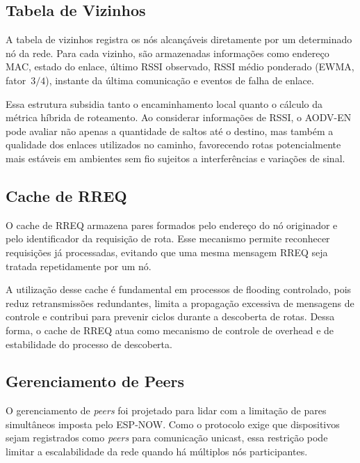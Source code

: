 \subsection{Tabela de Vizinhos}\label{tabela-de-vizinhos}

A tabela de vizinhos registra os nós alcançáveis diretamente por um
determinado nó da rede. Para cada vizinho, são armazenadas informações
como endereço MAC, estado do enlace, último RSSI observado, RSSI médio
ponderado (EWMA, fator~$3/4$), instante da última comunicação e eventos
de falha de enlace.

Essa estrutura subsidia tanto o encaminhamento local quanto o cálculo da
métrica híbrida de roteamento. Ao considerar informações de RSSI, o
AODV-EN pode avaliar não apenas a quantidade de saltos até o destino,
mas também a qualidade dos enlaces utilizados no caminho, favorecendo
rotas potencialmente mais estáveis em ambientes sem fio sujeitos a
interferências e variações de sinal.

\subsection{Cache de RREQ}\label{cache-de-rreq}

O cache de RREQ armazena pares formados pelo endereço do nó originador e
pelo identificador da requisição de rota. Esse mecanismo permite
reconhecer requisições já processadas, evitando que uma mesma mensagem
RREQ seja tratada repetidamente por um nó.

A utilização desse cache é fundamental em processos de flooding
controlado, pois reduz retransmissões redundantes, limita a propagação
excessiva de mensagens de controle e contribui para prevenir ciclos
durante a descoberta de rotas. Dessa forma, o cache de RREQ atua como
mecanismo de controle de overhead e de estabilidade do processo de
descoberta.

\subsection{Gerenciamento de Peers}\label{gerenciamento-de-peers}

O gerenciamento de \emph{peers} foi projetado para lidar com a limitação de
pares simultâneos imposta pelo ESP-NOW. Como o protocolo exige que
dispositivos sejam registrados como \emph{peers} para comunicação unicast, essa
restrição pode limitar a escalabilidade da rede quando há múltiplos nós
participantes.

